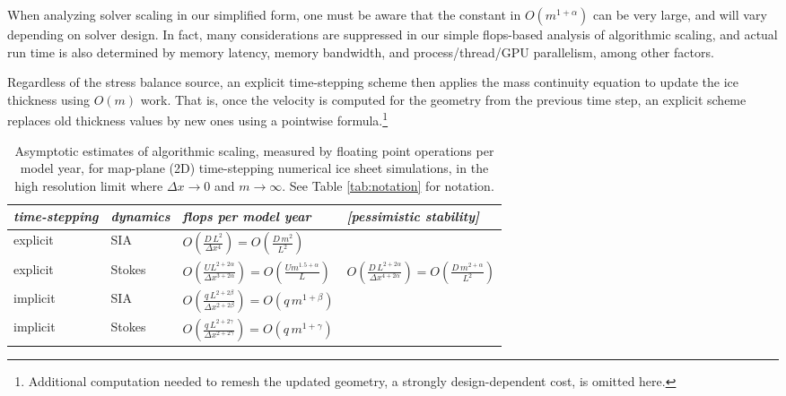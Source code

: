 \documentclass[twocolumn,letterpaper]{igs}
\begin{document}
When analyzing solver scaling in our simplified form, one must be aware that the constant in $O(m^{1+\alpha})$ can be very large, and will vary depending on solver design.  In fact, many considerations are suppressed in our simple flops-based analysis of algorithmic scaling, and actual run time is also determined by memory latency, memory bandwidth, and process/thread/GPU parallelism, among other factors.

Regardless of the stress balance source, an explicit time-stepping scheme then applies the mass continuity equation to update the ice thickness using $O(m)$ work.  That is, once the velocity is computed for the geometry from the previous time step, an explicit scheme replaces old thickness values by new ones using a pointwise formula.\footnote{Additional computation needed to remesh the updated geometry, a strongly design-dependent cost, is omitted here.}

\newcommand{\oo}[1]{\displaystyle O\left(#1\right)}
\setlength{\tabcolsep}{5pt}
\renewcommand{\arraystretch}{1.5}
\begin{table*}[ht]
{\normalsize
\begin{tabular}{llll}
\emph{time-stepping} & \emph{dynamics} & \emph{flops per model year} & \emph{[pessimistic stability]} \\ \hline
explicit & SIA    & $\oo{\frac{D\, L^2}{\Delta x^4}} = \oo{\frac{D\, m^2}{L^2}}${\Huge \strut} \\
explicit & Stokes & $\oo{\frac{U L^{2+2\alpha}}{\Delta x^{3+2\alpha}}} = \oo{\frac{U m^{1.5+\alpha}}{L}}${\Huge \strut}\phantom{x} & $\oo{\frac{D\, L^{2+2\alpha}}{\Delta x^{4+2\alpha}}} = \oo{\frac{D\,m^{2+\alpha}}{L^2}}$ \\
implicit & SIA    & $\oo{\frac{q\, L^{2+2\beta}}{\Delta x^{2+2\beta}}} = \oo{q\, m^{1+\beta}}${\Huge \strut} \\
implicit & Stokes & $\oo{\frac{q\, L^{2+2\gamma}}{\Delta x^{2+2\gamma}}} = \oo{q\, m^{1+\gamma}}${\Huge \strut}
\end{tabular}
}
\caption{Asymptotic estimates of algorithmic scaling, measured by floating point operations per model year, for map-plane (2D) time-stepping numerical ice sheet simulations, in the high resolution limit where $\Delta x\to 0$ and $m\to\infty$.  See Table \ref{tab:notation} for notation.}
\label{tab:performancemodel}
\end{table*}
\end{document}
